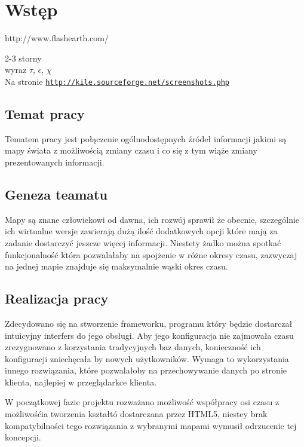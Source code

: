 \chapter{Wstęp}
\label{cha:wstep}

http://www.flashearth.com/

2-3 storny\\
wyraz $\tau$, $\epsilon$, $\chi$\\
Na stronie \underline{\texttt{http://kile.sourceforge.net/screenshots.php}}\\

\section{Temat pracy}
\label{sec:tematPracy}

Tematem pracy jest połączenie ogólnodostępnych źródeł informacji jakimi są mapy świata z możliwością zmiany czasu i co się z tym wiąże zmiany prezentowanych informacji.

\section{Geneza teamatu}
\label{sec:geneza}

Mapy są znane człowiekowi od dawna, ich rozwój sprawił że obecnie, szczególnie ich wirtualne wersje zawierają dużą ilość dodatkowych opcji które mają za zadanie dostarczyć jeszcze więcej informacji. Niestety żadko można spotkać funkcjonalność która pozwalałaby na spojżenie w różne okresy czasu, zazwyczaj na jednej mapie znajduje się maksymalnie wąski okres czasu.

\section{Realizacja pracy}
\label{sec:realizacja}

Zdecydowano się na stworzenie frameworku, programu który będzie dostarczał intuicyjny interfers do jego obsługi. Aby jego konfiguracja nie zajmowała czasu zrezygnowano z korzystania tradycyjnych baz danych, konieczność ich konfiguracji zniechęcała by nowych użytkowników. Wymaga to wykorzystania innego rozwiązania, które pozwalałoby na przechowywanie danych po stronie klienta, najlepiej w przeglądarkce klienta.

W początkowej fazie projektu rozważano możliwość współpracy osi czasu z możliwośćia tworzenia kształtó dostarczana przez HTML5, niestey brak kompatybilności tego rozwiązania z wybranymi mapami wymusił odrzucenie tej koncepcji.

